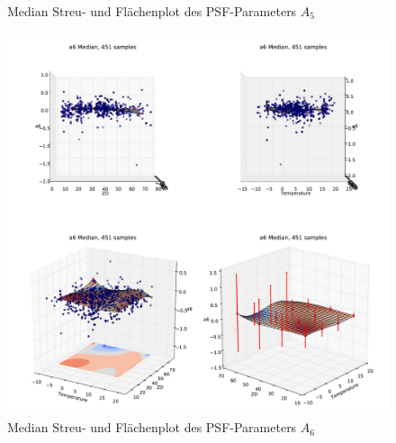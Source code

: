 \begin{appendix}
\begin{figure}[H]
	\caption[Median Streu- und Flächenplot des PSF-Parameters $A_5$]{Median Streu- und Flächenplot des PSF-Parameters $A_5$}
    \label{psf_surf_a5_med}
\end{figure}
\begin{figure}[H]
	\centering
	\includegraphics[scale=.48]{psf_surf/a6_med.pdf}
	\caption[Mean Streu- und Flächenplot des PSF-Parameters $A_6$]{Median Streu- und Flächenplot des PSF-Parameters $A_6$}
    \label{psf_surf_a6_med}
\end{figure}


\end{appendix}
